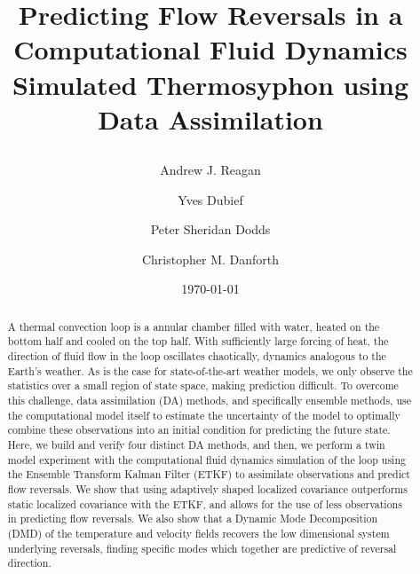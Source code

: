 \documentclass[pre,twocolumn,twoside,byrevtex,superscriptaddress]{revtex4}
\begin{document}
\title{
  Predicting Flow Reversals in a Computational Fluid Dynamics Simulated Thermosyphon using Data Assimilation

}

\author{Andrew J. Reagan}
\author{Yves Dubief}
\author{Peter Sheridan Dodds}
\author{Christopher M. Danforth}

\date{\today}

\begin{abstract}
A thermal convection loop is a annular chamber filled with water, heated on the bottom half and cooled on the top half.
With sufficiently large forcing of heat, the direction of fluid flow in the loop oscillates chaotically, dynamics analogous to the Earth's weather.
As is the case for state-of-the-art weather models, we only observe the statistics over a small region of state space, making prediction difficult.
To overcome this challenge, data assimilation (DA) methods, and specifically ensemble methods, use the computational model itself to estimate the uncertainty of the model to optimally combine these observations into an initial condition for predicting the future state.
Here, we build and verify four distinct DA methods, and then, we perform a twin model experiment with the computational fluid dynamics simulation of the loop using the Ensemble Transform Kalman Filter (ETKF) to assimilate observations and predict flow reversals.
We show that using adaptively shaped localized covariance outperforms static localized covariance with the ETKF, and allows for the use of less observations in predicting flow reversals.
We also show that a Dynamic Mode Decomposition (DMD) of the temperature and velocity fields recovers the low dimensional system underlying reversals, finding specific modes which together are predictive of reversal direction.
\end{abstract}
  
\end{document}
